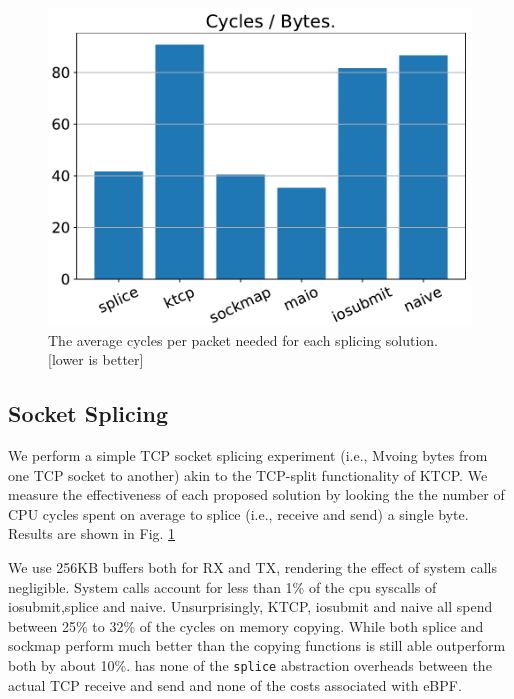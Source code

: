 \begin{figure}[t]
    \centering
    \includegraphics[width=\columnwidth]{splice.pdf}
    \caption{The average cycles per packet needed for each splicing solution. [lower is better]}
    \label{fig:cyc_byte}
\end{figure}

\subsection{Socket Splicing}
We perform a simple TCP socket splicing experiment (i.e., Mvoing bytes from one TCP socket to another) akin to the TCP-split functionality of KTCP. We measure the effectiveness of each proposed solution by looking the the number of CPU cycles spent on average to splice (i.e., receive and send) a single byte. Results are shown in Fig. \ref{fig:cyc_byte}

We use 256KB buffers both for RX and TX, rendering the effect of system calls negligible. System calls account for less than 1\% of the cpu syscalls of iosubmit,splice and naive. Unsurprisingly, KTCP, iosubmit and naive all spend between 25\% to 32\% of the cycles on memory copying. While both splice and sockmap perform much better than the copying functions \oursys is still able outperform both by about 10\%. \oursys has none of the \texttt{splice} abstraction overheads between the actual TCP receive and send and none of the costs associated with eBPF. 





